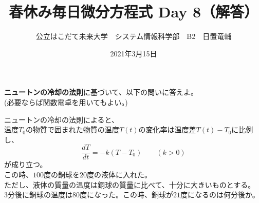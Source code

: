 \documentclass[dvipdfmx,uplatex]{jsarticle}
\title{春休み毎日微分方程式 Day 8（解答）}
\author{公立はこだて未来大学　システム情報科学部　B2　日置竜輔}
\date{2021年3月15日}
\begin{document}
\begin{spacing}{1.6}
\maketitle

{\bf ニュートンの冷却の法則}に基づいて、以下の問いに答えよ。\\
(必要ならば関数電卓を用いてもよい。)
\begin{qparts}
  \qpart
  ニュートンの冷却の法則によると、\\
  温度$T_0$の物質で囲まれた物質の温度$T(t)$の変化率は温度差$T(t) - T_0$に比例し、
  \begin{equation}
    \frac{dT}{dt} = -k(T - T_0) \qquad (k > 0)\nonumber
  \end{equation}
  が成り立つ。\\
  この時、$100$度の銅球を$20$度の液体に入れた。\\
  ただし、液体の質量の温度は銅球の質量に比べて、十分に大きいものとする。\\
  $3$分後に銅球の温度は$80$度になった。この時、銅球が$21$度になるのは何分後か。\\


\end{qparts}
\end{spacing}
\end{document}
